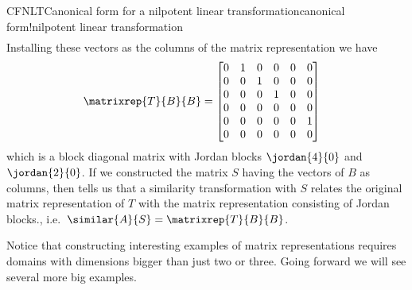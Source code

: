 \begin{example}{CFNLT}{Canonical form for a nilpotent linear transformation}{canonical form!nilpotent linear transformation}
\begin{align*}
%
\end{align*}
%
Installing these vectors as the columns of the matrix representation we have
%
\begin{align*}
\matrixrep{T}{B}{B}&=
\begin{bmatrix}
 0 & 1 & 0 & 0 & 0 & 0 \\
 0 & 0 & 1 & 0 & 0 & 0 \\
 0 & 0 & 0 & 1 & 0 & 0 \\
 0 & 0 & 0 & 0 & 0 & 0 \\
 0 & 0 & 0 & 0 & 0 & 1 \\
 0 & 0 & 0 & 0 & 0 & 0
\end{bmatrix}
\end{align*}
%
which is a block diagonal matrix with Jordan blocks $\jordan{4}{0}$ and $\jordan{2}{0}$.   If we constructed the matrix $S$ having the vectors of $B$ as columns, then  tells us that a similarity transformation with $S$ relates the original matrix representation of $T$ with the matrix representation consisting of Jordan blocks., i.e.\ $\similar{A}{S}=\matrixrep{T}{B}{B}$.
%
\end{example}
%
Notice that constructing interesting examples of matrix representations requires domains with dimensions bigger than just two or three.  Going forward we will see several more big examples.
%
%
